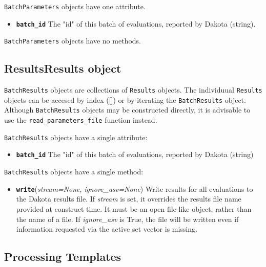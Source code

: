 {\tt BatchParameters} objects have one attribute.

\begin{itemize}
  \item{} \label{index:dakota.interfacing.BatchParameters.batch_id}\textbf{\texttt{batch\_id}} The "id" of this batch of evaluations, reported by Dakota (string).
\end{itemize}

{\tt BatchParameters} objects have no methods.

\subsection{ResultsResults object}

{\tt BatchResults} objects are collections of {\tt Results} objects. The individuual {\tt Results} objects can be
accesed by index ({[}{]}) or by iterating the {\tt BatchResults} object. Although {\tt BatchResults} objects may be 
constructed directly, it is advisable to use the {\tt read\_parameters\_file} function instead.

{\tt BatchResults} objects have a single attribute:

\begin{itemize}
  \item{} \label{index:dakota.interfacing.BatchResults.batch_id}\textbf{\texttt{batch\_id}} The "id" of this batch of evaluations, reported by Dakota (string)
\end{itemize}

{\tt BatchResults} objects have a single method:

\begin{itemize}
\item {}
	\label{index:dakota.interfacing.Results.write}\textbf{\texttt{write}}({\emph{stream=None}, \emph{ignore\_asv=None}}){}
	Write results for all evaluations to the Dakota results file. If \emph{stream} is set, it overrides the results file name provided at construct time. It must be an open file-like object, rather than the name of a file. If \emph{ignore\_asv} is True, the file will be written even if information requested via the active set vector is missing.
\end{itemize}
\subsection{Processing Templates}

